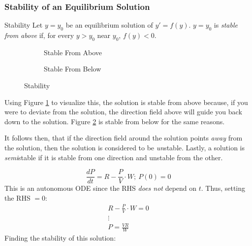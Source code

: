 \documentclass[12pt]{article}
\begin{document}
\subsubsection{Stability of an Equilibrium Solution}
\label{sssec:stabilityOfAnEqulibriumSolution}

\begin{definition}{Stability}
  Let $y=y_0$ be an equilibrium solution of $y' = f(y)$. $y=y_0$ is \textit{stable from above} if, for every $y>y_0$ near $y_0$, $f(y)<0$.
\end{definition}

\begin{figure}[H]
  \centering
  \begin{subfigure}[H]{0.45\textwidth}
    \centering
    
    \caption{Stable From Above}
    \label{fig:002}
  \end{subfigure}
  \begin{subfigure}[H]{0.45\textwidth}
    \centering
    
    \caption{Stable From Below}
    \label{fig:003}
  \end{subfigure}
  \caption{Stability}
  \label{fig:stability}
\end{figure}
Using Figure \ref{fig:002} to visualize this, the {\color{gr} solution} is stable from above because, if you were to deviate from the solution, the direction field above will guide you back down to the solution. Figure \ref{fig:003} is stable from below for the same reasons.

It follows then, that if the direction field around the solution points \textit{away} from the solution, then the solution is considered to be \textit{un}stable. Lastly, a solution is \textit{semi}stable if it is stable from one direction and unstable from the other.

\begin{example}
  \begin{equation*}
    \frac{dP}{dt} = R - \frac{P}{V}\cdot W;\ P(0) = 0
  \end{equation*}
  This is an autonomous ODE since the RHS \textit{does not} depend on $t$. Thus, setting the RHS $= 0$:
  \begin{gather*}
    R - \frac{P}{V}\cdot W=0 \\
    \vdots \\
    P= \frac{VR}{W}
  \end{gather*}
  Finding the stability of this solution: %
\end{example}
\end{document}
